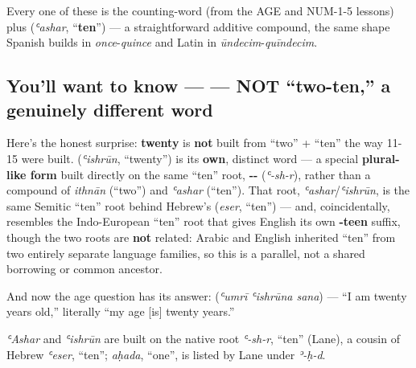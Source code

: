 Every one of these is the counting-word (from the AGE and NUM-1-5 lessons) plus \textbf{} (\emph{ʿashar}, \textquotedblleft{}\textbf{ten}\textquotedblright{}) — a straightforward additive compound, the same shape Spanish builds in \emph{once}-\emph{quince} and Latin in \emph{ūndecim}-\emph{quīndecim}.

\subsection*{You'll want to know —  — NOT \textquotedblleft{}two-ten,\textquotedblright{} a genuinely different word}
Here's the honest surprise: \textbf{twenty} is \textbf{not} built from \textquotedblleft{}two\textquotedblright{} + \textquotedblleft{}ten\textquotedblright{} the way 11-15 were built. \textbf{} (\emph{ʿishrūn}, \textquotedblleft{}twenty\textquotedblright{}) is its \textbf{own}, distinct word — a special \textbf{plural-like form} built directly on the same \textquotedblleft{}ten\textquotedblright{} root, \textbf{--} (\emph{ʿ-sh-r}), rather than a compound of \emph{ithnān} (\textquotedblleft{}two\textquotedblright{}) and \emph{ʿashar} (\textquotedblleft{}ten\textquotedblright{}). That root, \emph{ʿashar}/\emph{ʿishrūn}, is the same Semitic \textquotedblleft{}ten\textquotedblright{} root behind Hebrew's \textbf{} (\emph{eser}, \textquotedblleft{}ten\textquotedblright{}) — and, coincidentally, resembles the Indo-European \textquotedblleft{}ten\textquotedblright{} root that gives English its own \textbf{-teen} suffix, though the two roots are \textbf{not} related: Arabic and English inherited \textquotedblleft{}ten\textquotedblright{} from two entirely separate language families, so this is a parallel, not a shared borrowing or common ancestor.

And now the age question has its answer: \textbf{  } (\emph{ʿumrī ʿishrūna sana}) — \textquotedblleft{}I am twenty years old,\textquotedblright{} literally \textquotedblleft{}my age {[}is{]} twenty years.\textquotedblright{}

\begin{cousinweb}
\emph{ʿAshar} and \emph{ʿishrūn} are built on the native root \emph{ʿ-sh-r}, \textquotedblleft{}ten\textquotedblright{} (Lane), a cousin of Hebrew \emph{ʿeser}, \textquotedblleft{}ten\textquotedblright{}; \emph{aḥada}, \textquotedblleft{}one\textquotedblright{}, is listed by Lane under \emph{ʾ-ḥ-d}.
\end{cousinweb}

